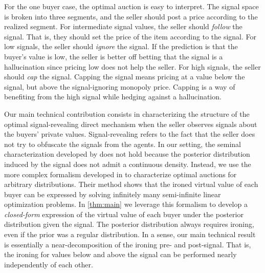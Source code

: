 For the one buyer case, the optimal auction is easy to interpret. The signal space is broken into three segments, and the seller should post a price according to the realized segment. For intermediate signal values, the seller should \textit{follow} the signal. That is, they should set the price of the item according to the signal. For low signals, the seller should \textit{ignore} the signal. If the prediction is that the buyer's value is low, the seller is better off betting that the signal is a hallucination since pricing low does not help the seller. For high signals, the seller should \textit{cap} the signal. Capping the signal means pricing at a value below the signal, but above the signal-ignoring monopoly price. Capping is a way of benefiting from the high signal while hedging against a hallucination. 

Our main technical contribution consists in characterizing the structure of the optimal signal-revealing direct mechanism when the seller observes signals about the buyers' private values. Signal-revealing refers to the fact that the seller does not try to obfuscate the signals from the agents.  In our setting, the seminal characterization developed by \citet{myerson1981optimal} does not hold because the posterior distribution induced by the signal does not admit a continuous density. Instead, we use the more complex formalism developed in \citet{monteiro2010optimal} to characterize optimal auctions for arbitrary distributions. Their method shows that the ironed virtual value of each buyer can be expressed by solving infinitely many semi-infinite linear optimization problems. In \cref{thm:main} we leverage this formalism to develop a \textit{closed-form} expression of the virtual value of each buyer under the posterior distribution given the signal. The posterior distribution always requires ironing, even if the prior was a regular distribution. In a sense, our main technical result is essentially a near-decomposition of the ironing pre- and post-signal. That is, the ironing for values below and above the signal can be performed nearly independently of each other.




